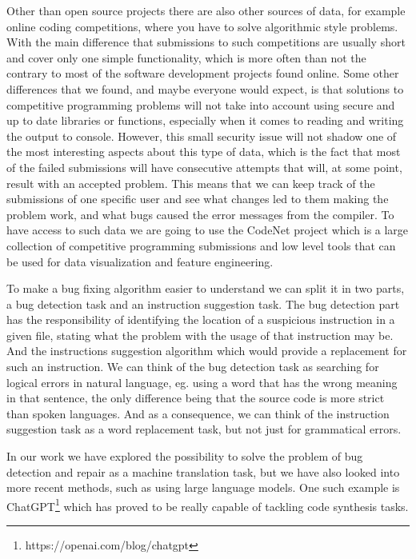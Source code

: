 \documentclass[12pt,a4paper]{report}
\begin{document}
Other than open source projects there are also other sources of data, for example online coding competitions, where you have to solve algorithmic style problems. With the main difference that submissions to such competitions are usually short and cover only one simple functionality, which is more often than not the contrary to most of the software development projects found online. Some other differences that we found, and maybe everyone would expect, is that solutions to competitive programming problems will not take into account using secure and up to date libraries or functions, especially when it comes to reading and writing the output to console. However, this small security issue will not shadow one of the most interesting aspects about this type of data, which is the fact that most of the failed submissions will have consecutive attempts that will, at some point, result with an accepted problem. This means that we can keep track of the submissions of one specific user and see what changes led to them making the problem work, and what bugs caused the error messages from the compiler. To have access to such data we are going to use the CodeNet project \cite{puri2021codenet} which is a large collection of competitive programming submissions and low level tools that can be used for data visualization and feature engineering. 

To make a bug fixing algorithm easier to understand we can split it in two parts, a bug detection task and an instruction suggestion task. The bug detection part has the responsibility of identifying the location of a suspicious instruction in a given file, stating what the problem with the usage of that instruction may be. And the instructions suggestion algorithm which would provide a replacement for such an instruction. We can think of the bug detection task as searching for logical errors in natural language, eg. using a word that has the wrong meaning in that sentence, the only difference being that the source code is more strict than spoken languages. And as a consequence, we can think of the instruction suggestion task as a word replacement task, but not just for grammatical errors.

In our work we have explored the possibility to solve the problem of bug detection and repair as a machine translation task, but we have also looked into more recent methods, such as using large language models. One such example is ChatGPT\footnote{https://openai.com/blog/chatgpt} which has proved to be really capable of tackling code synthesis tasks.
\end{document}
